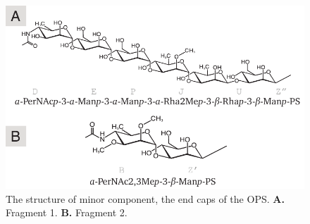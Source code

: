 \begin{figure}[htb]
  \begin{center}
    \includegraphics[]{lps_chapter/img/lpsends.pdf}
  \end{center}
  \caption[The structure of minor component, the end caps of the \ac{OPS}.]{The structure of minor component, the end caps of the \ac{OPS}. \textbf{A.} Fragment 1. \textbf{B.} Fragment 2.}
  \label{fig:lpsends}
\end{figure}

